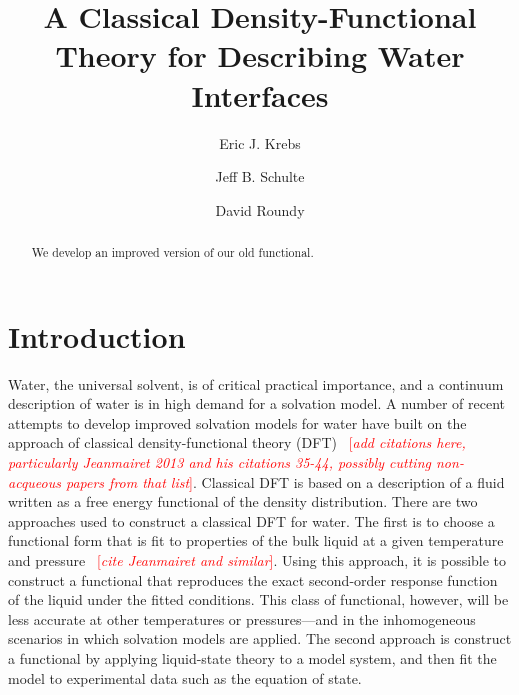 \documentclass[twocolumn,amsmath,amssymb,prl]{revtex4-1}
\newcommand{\fixme}[1]{\textcolor{red}{[\emph{#1}]}}
\begin{document}
\title{A Classical Density-Functional Theory for Describing Water Interfaces}

\author{Eric J. Krebs}
\author{Jeff B. Schulte}
\author{David Roundy}

\begin{abstract}
We develop an improved version of our old functional.
\end{abstract}
\maketitle

\section{Introduction}

Water, the universal solvent, is of critical practical importance, and
a continuum description of water is in high demand for a solvation
model.  A number of recent attempts to develop improved solvation
models for water have built on the approach of classical
density-functional theory (DFT)\cite{jeanmairet2013molecular,
  zhao2011molecular, zhao2011new, ramirez2005direct,
  ramirez2005density, levesque2012solvation, levesque2012scalar}
~\fixme{add citations here, particularly Jeanmairet 2013 and his
  citations 35-44, possibly cutting non-acqueous papers from that
  list}.  Classical DFT is based on a description of a fluid written
as a free energy functional of the density distribution.  There are
two approaches used to construct a classical DFT for water.  The first
is to choose a functional form that is fit to properties of the bulk
liquid at a given temperature and pressure
\cite{jeanmairet2013molecular} ~\fixme{cite Jeanmairet and similar}.
Using this approach, it is possible to construct a functional that
reproduces the exact second-order response function of the liquid
under the fitted conditions.  This class of functional, however, will
be less accurate at other temperatures or pressures---and in the
inhomogeneous scenarios in which solvation models are applied.  The
second approach is construct a functional by applying liquid-state
theory to a model system, and then fit the model to experimental data
such as the equation of state.
\end{document}
